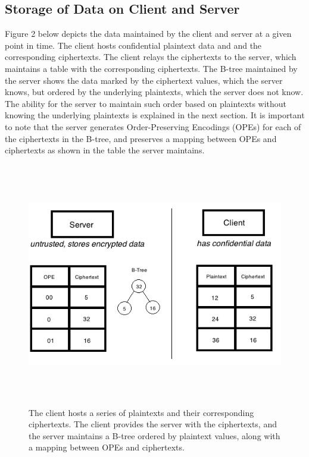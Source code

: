 \documentclass[12pt]{article}
\begin{document}
\subsection{Storage of Data on Client and Server}

Figure 2 below depicts the data maintained by the client and server at a given point in time. The client hosts confidential plaintext data and and the corresponding ciphertexts. The client relays the ciphertexts to the server, which maintains a table with the corresponding ciphertexts. The B-tree maintained by the server shows the data marked by the ciphertext values, which the server knows, but ordered by the underlying plaintexts, which the server does not know. The ability for the server to maintain such order based on plaintexts without knowing the underlying plaintexts is explained in the next section. It is important to note that the server generates Order-Preserving Encodings (OPEs) for each of the ciphertexts in the B-tree, and preserves a mapping between OPEs and ciphertexts as shown in the table the server maintains.

\begin{figure}[htb]
\begin{center}
\includegraphics[height=4.2in,width=6in,angle=0]{857pic6.png}
\caption{The client hosts a series of plaintexts and their corresponding ciphertexts. The client provides the server with the ciphertexts, and the server maintains a B-tree ordered by plaintext values, along with a mapping between OPEs and ciphertexts.}
\end{center}
\end{figure}
\end{document}
